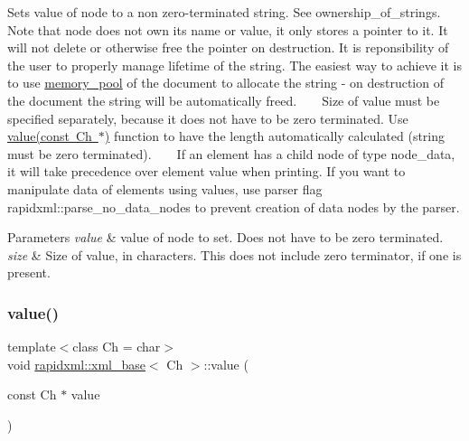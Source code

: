 Sets value of node to a non zero-\/terminated string. See ownership\+\_\+of\+\_\+strings. ~\newline
~\newline
 Note that node does not own its name or value, it only stores a pointer to it. It will not delete or otherwise free the pointer on destruction. It is reponsibility of the user to properly manage lifetime of the string. The easiest way to achieve it is to use \mbox{\hyperlink{classrapidxml_1_1memory__pool}{memory\+\_\+pool}} of the document to allocate the string -\/ on destruction of the document the string will be automatically freed. ~\newline
~\newline
 Size of value must be specified separately, because it does not have to be zero terminated. Use \mbox{\hyperlink{classrapidxml_1_1xml__base_a81e63ec4bfd2d7ef0a6c2ed49be6e623}{value(const Ch $\ast$)}} function to have the length automatically calculated (string must be zero terminated). ~\newline
~\newline
 If an element has a child node of type node\+\_\+data, it will take precedence over element value when printing. If you want to manipulate data of elements using values, use parser flag rapidxml\+::parse\+\_\+no\+\_\+data\+\_\+nodes to prevent creation of data nodes by the parser. 
\begin{DoxyParams}{Parameters}
{\em value} & value of node to set. Does not have to be zero terminated. \\
\hline
{\em size} & Size of value, in characters. This does not include zero terminator, if one is present. \\
\hline
\end{DoxyParams}
\mbox{\label{classrapidxml_1_1xml__base_a81e63ec4bfd2d7ef0a6c2ed49be6e623}} 
\subsubsection{\texorpdfstring{value()}{value()}\hspace{0.1cm}{\footnotesize\ttfamily [3/3]}}
{\footnotesize\ttfamily template$<$class Ch  = char$>$ \\
void \mbox{\hyperlink{classrapidxml_1_1xml__base}{rapidxml\+::xml\+\_\+base}}$<$ Ch $>$\+::value (\begin{DoxyParamCaption}\item[{const Ch $\ast$}]{value }\end{DoxyParamCaption})\hspace{0.3cm}{\ttfamily [inline]}}

